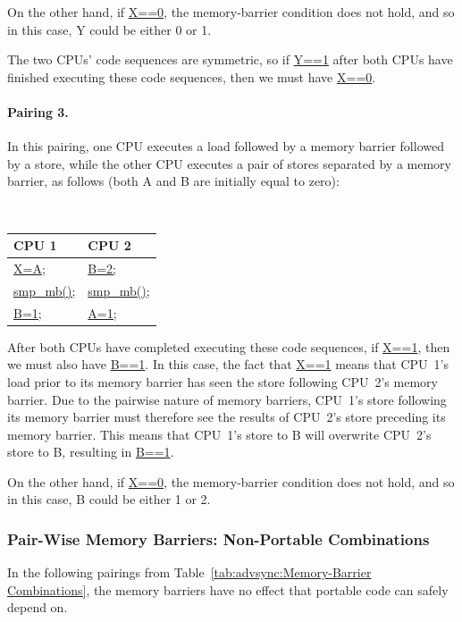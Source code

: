 	On the other hand, if \url{X==0}, the memory-barrier condition
	does not hold, and so in this case, Y could be either 0 or 1.

	The two CPUs' code sequences are symmetric, so if \url{Y==1}
	after both CPUs have finished executing these code sequences,
	then we must have \url{X==0}.

\paragraph{Pairing 3.}
	In this pairing, one CPU executes a load followed by a
	memory barrier followed by a store, while the other CPU
	executes a pair of stores separated by a memory barrier,
	as follows (both A and B are initially equal to zero):
	\vspace{5pt}
	\begin{minipage}[t]{\columnwidth}
	\tt
	\begin{tabular}{l|l}
		CPU 1 &			CPU 2 \\
		\hline
		\url{X=A;} &		\url{B=2;} \\
		\url{smp_mb();} &	\url{smp_mb();} \\
		\url{B=1;} &		\url{A=1;} \\
	\end{tabular}
	\end{minipage}
	\vspace{5pt}
	After both CPUs have completed executing these code sequences,
	if \url{X==1}, then we must also have \url{B==1}.
	In this case, the fact that \url{X==1} means that
	CPU~1's load prior to its memory barrier has
	seen the store following CPU~2's memory barrier.
	Due to the pairwise nature of memory barriers, CPU~1's
	store following its memory barrier must therefore see
	the results of CPU~2's store preceding its memory barrier.
	This means that CPU~1's store to B will overwrite CPU~2's
	store to B, resulting in \url{B==1}.

	On the other hand, if \url{X==0}, the memory-barrier condition
	does not hold, and so in this case, B could be either 1 or 2.

\subsubsection{Pair-Wise Memory Barriers: Non-Portable Combinations}

In the following pairings from
Table~\ref{tab:advsync:Memory-Barrier Combinations},
the memory barriers have no effect that portable code can
safely depend on.

